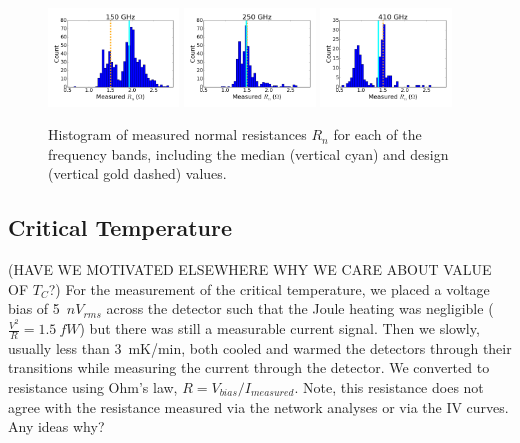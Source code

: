 \begin{figure}[ht!]
\centering
\includegraphics[width=0.31\textwidth]{figures/150_rn_hist.png}
\includegraphics[width=0.31\textwidth]{figures/250_rn_hist.png}
\includegraphics[width=0.31\textwidth]{figures/410_rn_hist.png}
\caption{Histogram of measured normal resistances $R_{n}$ for each of the frequency bands, including the median (vertical cyan)  
and design (vertical gold dashed) values.
}
\label{fig:rn_histograms}
\end{figure}

\subsection{Critical Temperature}
\label{sec:critical_temp}

(HAVE WE MOTIVATED ELSEWHERE WHY WE CARE ABOUT VALUE OF $T_{C}$?) 
For the measurement of the critical temperature, we placed a voltage bias of 5~$nV_{rms}$ across the detector such that the Joule heating was negligible ($\frac{V^2}{R} = 1.5~fW$) but there was still a measurable current signal. 
Then we slowly, usually less than 3~mK/min, both cooled and warmed the detectors through their transitions while measuring the current through the detector. 
We converted to resistance using Ohm's law, $R=V_{bias}/I_{measured}$.
Note, this resistance does not agree with the resistance measured via the network analyses or via the IV curves. Any ideas why?

